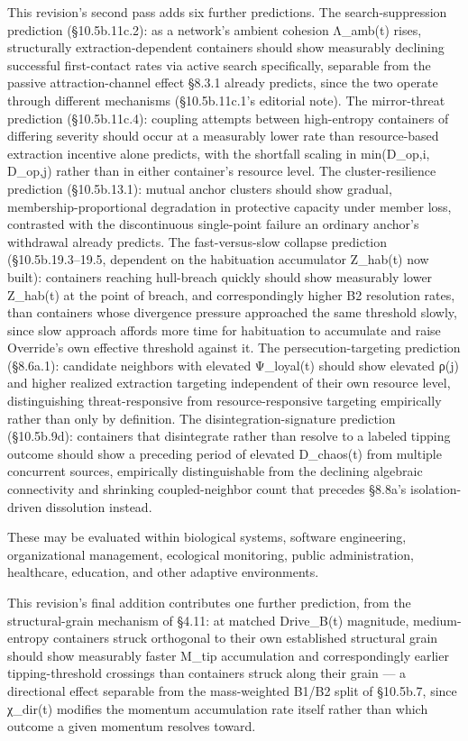 \documentclass[
]{article}
\begin{document}
This revision's second pass adds six further predictions. The
search-suppression prediction (§10.5b.11c.2): as a network's ambient
cohesion Λ\_amb(t) rises, structurally extraction-dependent containers
should show measurably declining successful first-contact rates via
active search specifically, separable from the passive
attraction-channel effect §8.3.1 already predicts, since the two operate
through different mechanisms (§10.5b.11c.1's editorial note). The
mirror-threat prediction (§10.5b.11c.4): coupling attempts between
high-entropy containers of differing severity should occur at a
measurably lower rate than resource-based extraction incentive alone
predicts, with the shortfall scaling in min(D\_op,i, D\_op,j) rather
than in either container's resource level. The cluster-resilience
prediction (§10.5b.13.1): mutual anchor clusters should show gradual,
membership-proportional degradation in protective capacity under member
loss, contrasted with the discontinuous single-point failure an ordinary
anchor's withdrawal already predicts. The fast-versus-slow collapse
prediction (§10.5b.19.3--19.5, dependent on the habituation accumulator
Z\_hab(t) now built): containers reaching hull-breach quickly should
show measurably lower Z\_hab(t) at the point of breach, and
correspondingly higher B2 resolution rates, than containers whose
divergence pressure approached the same threshold slowly, since slow
approach affords more time for habituation to accumulate and raise
Override's own effective threshold against it. The persecution-targeting
prediction (§8.6a.1): candidate neighbors with elevated Ψ\_loyal(t)
should show elevated ρ(j) and higher realized extraction targeting
independent of their own resource level, distinguishing
threat-responsive from resource-responsive targeting empirically rather
than only by definition. The disintegration-signature prediction
(§10.5b.9d): containers that disintegrate rather than resolve to a
labeled tipping outcome should show a preceding period of elevated
D\_chaos(t) from multiple concurrent sources, empirically
distinguishable from the declining algebraic connectivity and shrinking
coupled-neighbor count that precedes §8.8a's isolation-driven
dissolution instead.

These may be evaluated within biological systems, software engineering,
organizational management, ecological monitoring, public administration,
healthcare, education, and other adaptive environments.

This revision's final addition contributes one further prediction, from
the structural-grain mechanism of §4.11: at matched Drive\_B(t)
magnitude, medium-entropy containers struck orthogonal to their own
established structural grain should show measurably faster M\_tip
accumulation and correspondingly earlier tipping-threshold crossings
than containers struck along their grain --- a directional effect
separable from the mass-weighted B1/B2 split of §10.5b.7, since
χ\_dir(t) modifies the momentum accumulation rate itself rather than
which outcome a given momentum resolves toward.
\end{document}
